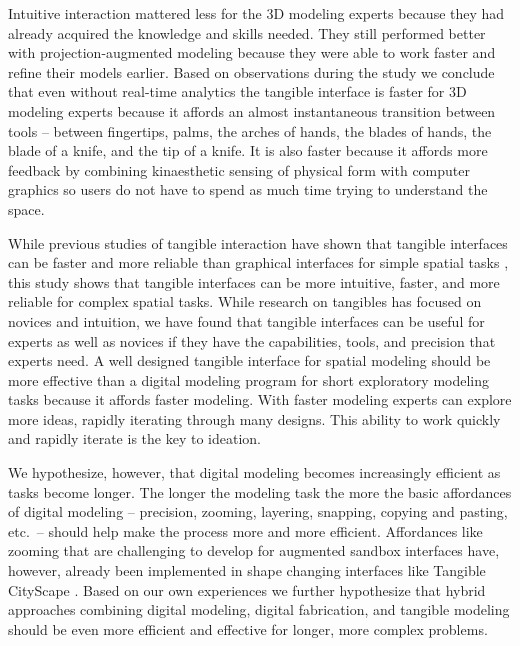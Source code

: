 \documentclass[prodmode,acmtochi]{acmsmall} %
\begin{document}
Intuitive interaction mattered less for the 3D modeling experts
because they had already acquired the knowledge and skills needed.
They still performed better with projection-augmented modeling
because they were able to work faster and refine their models earlier. 
%
Based on observations during the study we conclude that
even without real-time analytics
the tangible interface is faster for 3D modeling experts
because it affords an almost instantaneous transition
between tools -- between fingertips, palms, 
the arches of hands, the blades of hands, 
the blade of a knife, and the tip of a knife.
%
It is also faster because it affords more feedback 
by combining kinaesthetic sensing of physical form with computer graphics 
so users do not have to spend as much time trying to understand the space. 

While previous studies of tangible interaction 
have shown that tangible interfaces 
can be faster and more reliable than graphical interfaces 
for simple spatial tasks \cite{Huang2004,Couture2008},
this study shows that tangible interfaces can be 
more intuitive, faster, and more reliable for complex spatial tasks.
While research on tangibles has focused on novices and intuition,
we have found that tangible interfaces can be useful 
for experts as well as novices
if they have the capabilities, tools, and precision that experts need. 
A well designed tangible interface for spatial modeling 
should be more effective than a digital modeling program 
for short exploratory modeling tasks
because it affords faster modeling. 
With faster modeling experts can explore more ideas,
rapidly iterating through many designs. 
This ability to work quickly and rapidly iterate 
is the key to ideation. 

We hypothesize, however, that digital modeling 
becomes increasingly efficient as tasks become longer.
The longer the modeling task
the more the basic affordances of digital modeling
-- precision, zooming, layering, snapping, copying and pasting, etc.~--
should help make the process more and more efficient. 
%
Affordances like zooming 
that are challenging to develop for augmented sandbox interfaces
have, however, already been implemented in 
shape changing interfaces like Tangible CityScape \cite{Tang2013}.
%
Based on our own experiences
we further hypothesize that 
hybrid approaches combining 
digital modeling, digital fabrication, and tangible modeling 
should be even more efficient and effective
for longer, more complex problems.
\end{document}
